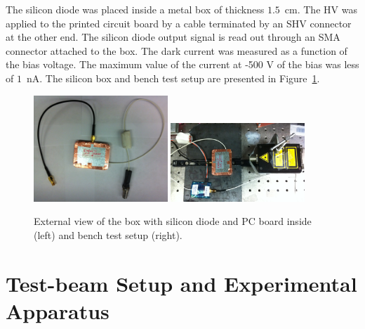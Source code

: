 \documentclass[12pt]{article}
\begin{document}
{The silicon diode was placed inside a metal box of thickness $1.5$~cm. 
The HV was applied to the printed circuit board by a cable terminated by an SHV connector
at the other end. The silicon diode output signal is read out through an SMA connector attached 
to the box. The dark current was measured as a function of the bias voltage. The maximum value of the 
current at -500 V of the bias was less of $1$~nA. The silicon box and bench test setup are presented 
in Figure~\ref{fig:SiliconPad}. 

\begin{figure}[htbp] 
\centering
\includegraphics[width=0.45\textwidth]{plots/SiliconPadExternalView.png} 
\includegraphics[width=0.45\textwidth]{plots/SiliconPadBench.png} 
\caption{External view of the box with silicon diode and PC board inside (left) and bench test setup (right).} 
\label{fig:SiliconPad} 
\end{figure} 




\section{Test-beam Setup and Experimental Apparatus }
\label{sec:tbeam}


}
\end{document}
